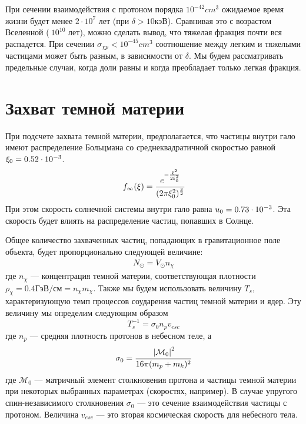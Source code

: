 При сечении взаимодействия с протоном порядка $10^{-42} cm^3$ ожидаемое время жизни будет менее $2 \cdot 10^7$ лет (при $\delta > 10 \text{кэВ}$). Сравнивая это с возрастом Вселенной ($~10^{10}$ лет), можно сделать вывод, что тяжелая фракция почти вся распадется. При сечении $\sigma_{\chi p} < 10^{-45} cm^3$ соотношение между легким и тяжелыми частицами может быть разным, в зависимости от $\delta$. Мы будем рассматривать предельные случаи, когда доли равны и когда преобладает только легкая фракция.


\section{Захват темной материи}

При подсчете захвата темной материи, предполагается, что частицы внутри гало имеют распределение Больцмана со среднеквадратичной скоростью равной $\xi_0 = {0.52}\cdot 10^{-3}$. 
\begin{equation}
	\label{dens_infty_xi}
	f_{\infty}(\xi)  = 
	\cfrac{e^{-\frac{\xi^2}{2\xi_0^2}}}{(2\pi\xi_0^2)^{\frac{3}{2}}}
\end{equation}
При этом скорость солнечной системы внутри гало равна $u_0 = {0.73}\cdot 10^{-3}$. Эта скорость будет влиять на распределение частиц, попавших в Солнце. 

Общее количество захваченных частиц, попадающих в гравитационное поле объекта, будет пропорционально следующей величине:
\begin{eqnarray}
	\label{eq:N_solar}
	N_{\odot} = V_{\odot} n_{\chi}
\end{eqnarray}
где $n_{\chi}$ --- концентрация темной материи, соответствующая плотности $\rho_{\chi} = 0.4 \text{ГэВ}/\text{см} = n_{\chi} m_{\chi}$.
Также мы будем использовать величину $T_s$, характеризующую темп процессов соударения частиц темной материи и ядер. Эту величину мы определим следующим образом
\begin{equation}
	\label{eq:T_s}
	T_s^{-1} = \sigma_{0} n_p v_{esc}
\end{equation}
где $n_p$ --- средняя плотность протонов в небесном теле, а 
\begin{equation}
	\label{sigma_0}
	\sigma_0 = \cfrac{\left| \mathcal{M}_0 \right|^{2}}{16\pi (m_p+m_k)^2}
\end{equation}
где $\mathcal{M}_0$ --- матричный элемент столкновения протона и частицы темной материи при некоторых выбранных параметрах (скоростях, например). В случае упругого спин-независимого столкновения $\sigma_0$ --- это сечение взаимодействия частицы с протоном.
Величина $v_{esc}$ --- это вторая космическая скорость для небесного тела.

